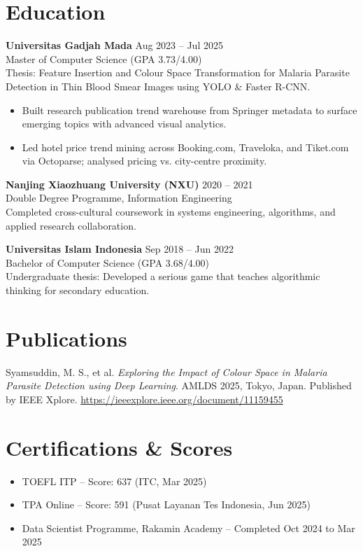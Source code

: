 \documentclass[11pt,a4paper]{article}
\begin{document}
\section*{Education}
\textbf{Universitas Gadjah Mada} \hfill Aug 2023 -- Jul 2025\\
Master of Computer Science (GPA 3.73/4.00) \\
Thesis: Feature Insertion and Colour Space Transformation for Malaria Parasite Detection in Thin Blood Smear Images using YOLO \& Faster R-CNN.\\
\begin{itemize}
  \item Built research publication trend warehouse from Springer metadata to surface emerging topics with advanced visual analytics.
  \item Led hotel price trend mining across Booking.com, Traveloka, and Tiket.com via Octoparse; analysed pricing vs. city-centre proximity.
\end{itemize}

\textbf{Nanjing Xiaozhuang University (NXU)} \hfill 2020 -- 2021\\
Double Degree Programme, Information Engineering\\
Completed cross-cultural coursework in systems engineering, algorithms, and applied research collaboration.

\textbf{Universitas Islam Indonesia} \hfill Sep 2018 -- Jun 2022\\
Bachelor of Computer Science (GPA 3.68/4.00)\\
Undergraduate thesis: Developed a serious game that teaches algorithmic thinking for secondary education.

\section*{Publications}
Syamsuddin, M. S., et al. \textit{Exploring the Impact of Colour Space in Malaria Parasite Detection using Deep Learning}. AMLDS 2025, Tokyo, Japan. Published by IEEE Xplore. \href{https://ieeexplore.ieee.org/document/11159455}{https://ieeexplore.ieee.org/document/11159455}

\section*{Certifications \& Scores}
\begin{itemize}
  \item TOEFL ITP -- Score: 637 (ITC, Mar 2025)
  \item TPA Online -- Score: 591 (Pusat Layanan Tes Indonesia, Jun 2025)
  \item Data Scientist Programme, Rakamin Academy -- Completed Oct 2024 to Mar 2025
\end{itemize}
\end{document}
